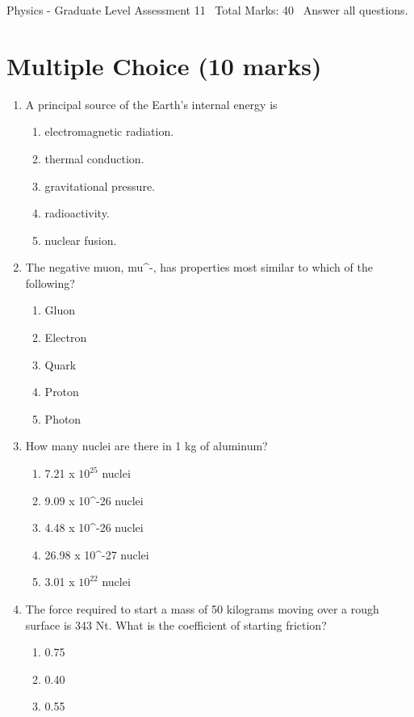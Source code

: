 \documentclass[12pt]{article}
\begin{document}
\begin{center}
Physics - Graduate Level Assessment 11 \
Total Marks: 40 \
Answer all questions.
\end{center}

\section*{Multiple Choice (10 marks)}
\begin{enumerate}[label=\arabic*.]
\item A principal source of the Earth's internal energy is
\begin{enumerate}[label=(\alph*)]
    \item electromagnetic radiation.
    \item thermal conduction.
    \item gravitational pressure.
    \item radioactivity.
    \item nuclear fusion.
\end{enumerate}
\item The negative muon, mu^-, has properties most similar to which of the following?
\begin{enumerate}[label=(\alph*)]
    \item Gluon
    \item Electron
    \item Quark
    \item Proton
    \item Photon
\end{enumerate}
\item How many nuclei are there in 1 kg of aluminum?
\begin{enumerate}[label=(\alph*)]
    \item 7.21 x $10^25$ nuclei
    \item 9.09 x 10^-26 nuclei
    \item 4.48 x 10^-26 nuclei
    \item 26.98 x 10^-27 nuclei
    \item 3.01 x $10^22$ nuclei
\end{enumerate}
\item The force required to start a mass of 50 kilograms moving over a rough surface is 343 Nt. What is the coefficient of starting friction?
\begin{enumerate}[label=(\alph*)]
    \item 0.75
    \item 0.40
    \item 0.55

\end{enumerate}
\end{enumerate}
\end{document}
